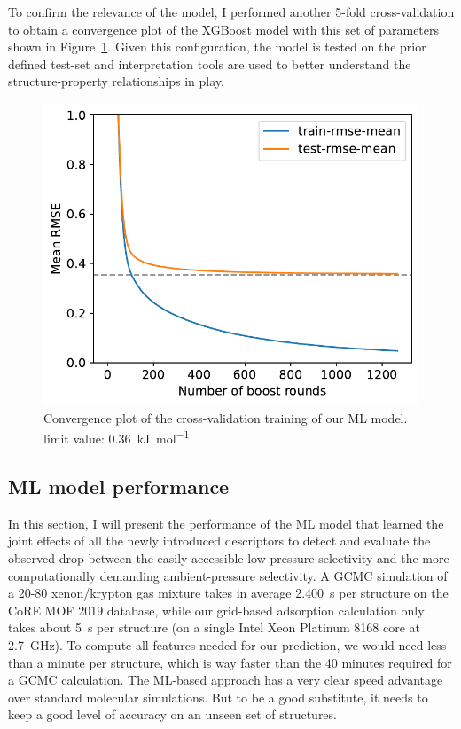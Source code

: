 \documentclass[main]{subfiles}
\begin{document}
To confirm the relevance of the model, I performed another 5-fold cross-validation to obtain a convergence plot of the XGBoost model with this set of parameters shown in Figure~\ref{fgr:convplot}. Given this configuration, the model is tested on the prior defined test-set and interpretation tools are used to better understand the structure-property relationships in play.

\begin{figure}[ht]
  \centering
    \includegraphics[width=0.60\linewidth]{figures/4-ml/SI_figure/convergence_plot.pdf}
    \caption{Convergence plot of the cross-validation training of our ML model. limit value: 0.36~\si{\kilo\joule\per\mole}}\label{fgr:convplot}
  \end{figure}

\subsection{ML model performance}

In this section, I will present the performance of the ML model that learned the joint effects of all the newly introduced descriptors to detect and evaluate the observed drop between the easily accessible low-pressure selectivity and the more computationally demanding ambient-pressure selectivity.
A GCMC simulation of a 20-80 xenon/krypton gas mixture takes in average \SI{2,400}{\second} per structure on the CoRE MOF 2019 database, while our grid-based adsorption calculation only takes about \SI{5}{\second} per structure (on a single Intel Xeon Platinum 8168 core at \SI{2.7}{\giga\hertz}). To compute all features needed for our prediction, we would need less than a minute per structure, which is way faster than the 40 minutes required for a GCMC calculation. The ML-based approach has a very clear speed advantage over standard molecular simulations. But to be a good substitute, it needs to keep a good level of accuracy on an unseen set of structures.
\end{document}
